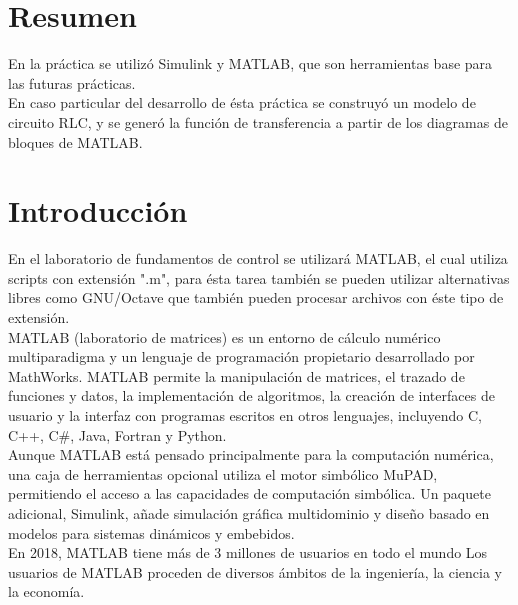 \documentclass[]{article}
\begin{document}

\tableofcontents  %


\section{Resumen}

En la práctica se utilizó Simulink y MATLAB, que son herramientas base para las futuras prácticas.\\

En caso particular del desarrollo de ésta práctica se construyó un modelo de circuito RLC, y se generó la función de transferencia a partir de los diagramas de bloques de MATLAB.\\

\section{Introducción}

En el laboratorio de fundamentos de control se utilizará MATLAB, el cual utiliza scripts con extensión ".m", para ésta tarea también se pueden utilizar alternativas libres como GNU/Octave que también pueden procesar archivos con éste tipo de extensión.\\

MATLAB (laboratorio de matrices) es un entorno de cálculo numérico multiparadigma y un lenguaje de programación propietario desarrollado por MathWorks. MATLAB permite la manipulación de matrices, el trazado de funciones y datos, la implementación de algoritmos, la creación de interfaces de usuario y la interfaz con programas escritos en otros lenguajes, incluyendo C, C++, C$\#$, Java, Fortran y Python.\cite{MATLABWiki}\\

Aunque MATLAB está pensado principalmente para la computación numérica, una caja de herramientas opcional utiliza el motor simbólico MuPAD, permitiendo el acceso a las capacidades de computación simbólica. Un paquete adicional, Simulink, añade simulación gráfica multidominio y diseño basado en modelos para sistemas dinámicos y embebidos.\cite{MATLABWiki}\\

En 2018, MATLAB tiene más de 3 millones de usuarios en todo el mundo Los usuarios de MATLAB proceden de diversos ámbitos de la ingeniería, la ciencia y la economía.\cite{MATLABWiki}\\ 
\end{document}
